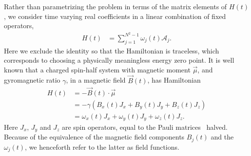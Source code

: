 \documentclass{jors}
\newcommand{\supervisordisagreement}[2]{\textcolor{green}{\texttt{{Supervisor disagreement!!! <<<<<<< Lincoln}}} \textcolor{blue}{#1} \textcolor{green}{\texttt{=======}} \textcolor{red}{#2} \textcolor{green}{\texttt{>>>>>>> James}}}
\begin{document}
		Rather than parametrizing the problem in terms of the matrix elements of $ H(t) $, we consider time varying real coefficients in a linear combination of fixed operators,
		\begin{align}
			H(t) &= \sum_{j = 1}^{N^2 - 1} \omega_j(t) \mathcal{A}_j.
		\end{align}
		Here we exclude the identity so that the Hamiltonian is traceless, which corresponds to choosing a physically meaningless energy zero point.
		It is well known that a charged spin-half system with magnetic moment $ \overrightarrow{\mu} $, and gyromagnetic ratio $ \gamma $, in a magnetic field $ \overrightarrow{B}(t) $, has Hamiltonian
		\begin{align}
			H(t) &= -\overrightarrow{B}(t)\cdot \overrightarrow{\mu}\\
			&= -\gamma \left(B_x(t) J_x + B_y(t) J_y + B_z(t) J_z\right)\\
			&= \omega_x(t) J_x + \omega_y(t) J_y + \omega_z(t) J_z.
		\end{align}
		Here $ J_x $, $ J_y $ and $ J_z $ are spin operators, equal to the Pauli matrices~\cite[(p169)]{j_j_sakurai_jun_john_modern_2011} halved.
		Because of the equivalence of the magnetic field components $ B_j(t) $ and the $ \omega_j(t) $, we henceforth refer to the latter as field functions.
\end{document}
